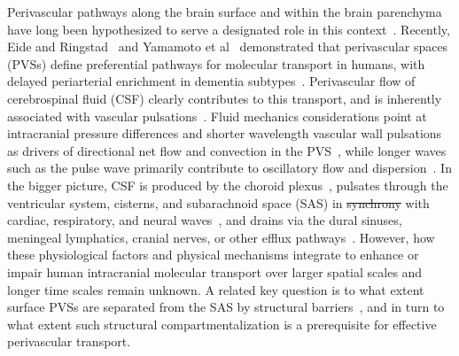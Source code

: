 \documentclass[fleqn,10pt]{wlscirep}
\providecommand{\DIFadd}[1]{{\protect\color{blue}\uwave{#1}}} %
\providecommand{\DIFdel}[1]{{\protect\color{red}\sout{#1}}}                      %
\providecommand{\DIFaddbegin}{} %
\providecommand{\DIFaddend}{} %
\providecommand{\DIFdelbegin}{} %
\providecommand{\DIFdelend}{} %
\begin{document}
Perivascular pathways along the brain surface and within the brain
parenchyma have long been hypothesized to serve a designated role in
this context~\cite{rennels1985evidence, zhang1990interrelationships,
  ichimura1991distribution, carare2008solutes, iliff2012paravascular,
  foley2012realtime, hannocks2018molecular, van2024caa}. Recently, Eide and
Ringstad~\cite{eide2024functional} and Yamamoto et
al~\cite{yamamoto2024perivascular} demonstrated that perivascular
spaces (PVSs) define preferential pathways for molecular transport in
humans, with delayed periarterial enrichment in dementia
subtypes~\cite{eide2024functional}. Perivascular flow of cerebrospinal
fluid (CSF) clearly contributes to this transport, and is inherently
associated with vascular pulsations~\cite{hadaczek2006perivascular,
  iliff2013cerebral, bedussi2018paravascular, mestre2018flow,
  boster2023artificial, hirschler2024region}. Fluid mechanics
considerations point at intracranial pressure differences and shorter
wavelength vascular wall pulsations as drivers of directional net flow
and convection in the PVS~\cite{bilston2003arterial, rey2018pulsatile,
  daversin2020mechanisms, kedarasetti2020functional,
  gjerde2023directional, nozaleda2024arterial}, while longer waves
such as the pulse wave primarily contribute to oscillatory flow and
dispersion~\cite{asgari2016glymphatic, sharp2019dispersion, thomas2019fluid,
  kedarasetti2020arterial, troyetsky2021dispersion, 
  martinac2021phase}. In the bigger picture, CSF is produced by the
choroid plexus~\cite{damkier2013cerebrospinal,
  steffensen2018cotransporter, liu2020direct}, pulsates through the
ventricular system, cisterns, and subarachnoid space (SAS) in
\DIFdelbegin \DIFdel{synchrony }\DIFdelend \DIFaddbegin \DIFadd{association }\DIFaddend with cardiac, respiratory, and neural
waves~\cite{greitz1993pulsatile, wagshul2011pulsating,
  sweetman2011cerebrospinal, fultz2019coupled, vinje2019respiratory,
  eide2021direction, causemann2022human, williams2023neural,
  zimmermann2023total}, and drains via the dural sinuses, meningeal
lymphatics, cranial nerves, or other efflux
pathways~\cite{proulx2021cerebrospinal}. However, how these
physiological factors and physical mechanisms integrate to enhance or
impair human intracranial molecular transport over larger spatial
scales and longer time scales remain unknown. A related key question
is to what extent surface PVSs are separated from the SAS by
structural barriers~\cite{zhang1990interrelationships,
  weller2005microscopic, bedussi2017paravascular,
  pizzo2018intrathecal, mestre2022periarteriolar,
  mollgard2023mesothelium, smets2024perivascular, eide2024functional},
and in turn to what extent such structural compartmentalization is a
prerequisite for effective perivascular transport.
\end{document}
